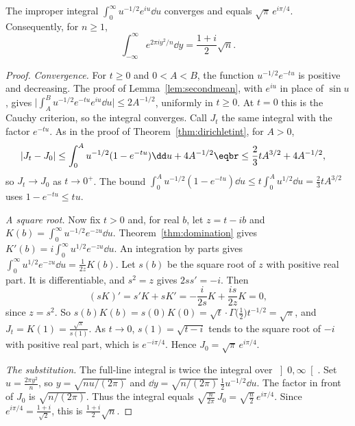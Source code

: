 \begin{lemma}\label{lem:fresnel}
The improper integral $\int_0^\infty u^{-1/2}e^{iu}\dd u$ converges and equals $\sqrt\pi\,e^{i\pi/4}$. Consequently, for $n\ge1$,
\[
\int_{-\infty}^\infty e^{2\pi iy^2/n}\dd y=\frac{1+i}2\sqrt n.
\]
\end{lemma}
\begin{proof}
\emph{Convergence.} For $t\ge0$ and $0<A<B$, the function $u^{-1/2}e^{-tu}$ is positive and decreasing. The proof of Lemma~\ref{lem:secondmean}, with $e^{iu}$ in place of $\sin u$, gives $\bigl|\int_A^Bu^{-1/2}e^{-tu}e^{iu}\dd u\bigr|\le2A^{-1/2}$, uniformly in $t\ge0$. At $t=0$ this is the Cauchy criterion, so the integral converges. Call $J_t$ the same integral with the factor $e^{-tu}$. As in the proof of Theorem~\ref{thm:dirichletint}, for $A>0$,
\[
\begin{aligned}|J_t-J_0|&\le\int_0^Au^{-1/2}(1-e^{-tu})\dd u+4A^{-1/2}\eqbr\le\frac23tA^{3/2}+4A^{-1/2},\end{aligned}
\]
so $J_t\to J_0$ as $t\to0^+$. The bound $\int_0^A u^{-1/2}(1-e^{-tu})\dd u\le t\int_0^A u^{1/2}\dd u=\frac23 t A^{3/2}$ uses $1-e^{-tu}\le tu$.

\emph{A square root.} Now fix $t>0$ and, for real $b$, let $z=t-ib$ and $K(b)=\int_0^\infty u^{-1/2}e^{-zu}\dd u$. Theorem~\ref{thm:domination} gives $K'(b)=i\int_0^\infty u^{1/2}e^{-zu}\dd u$. An integration by parts gives $\int_0^\infty u^{1/2}e^{-zu}\dd u=\frac1{2z}K(b)$. Let $s(b)$ be the square root of $z$ with positive real part. It is differentiable, and $s^2=z$ gives $2ss'=-i$. Then
\[
(sK)'=s'K+sK'=-\frac i{2s}K+\frac{is}{2z}K=0,
\]
since $z=s^2$. So $s(b)K(b)=s(0)K(0)=\sqrt t\cdot\Gamma\bigl(\frac12\bigr)t^{-1/2}=\sqrt\pi$, and $J_t=K(1)=\frac{\sqrt\pi}{s(1)}$. As $t\to0$, $s(1)=\sqrt{t-i}$ tends to the square root of $-i$ with positive real part, which is $e^{-i\pi/4}$. Hence $J_0=\sqrt\pi\,e^{i\pi/4}$.

\emph{The substitution.} The full-line integral is twice the integral over $\left]0,\infty\right[$. Set $u=\frac{2\pi y^2}n$, so $y=\sqrt{nu/(2\pi)}$ and $\dd y=\sqrt{n/(2\pi)}\,\frac12 u^{-1/2}\dd u$. The factor in front of $J_0$ is $\sqrt{n/(2\pi)}$. Thus the integral equals $\sqrt{\frac n{2\pi}}\,J_0=\sqrt{\frac n2}\,e^{i\pi/4}$. Since $e^{i\pi/4}=\frac{1+i}{\sqrt2}$, this is $\frac{1+i}2\sqrt n$.
\end{proof}

